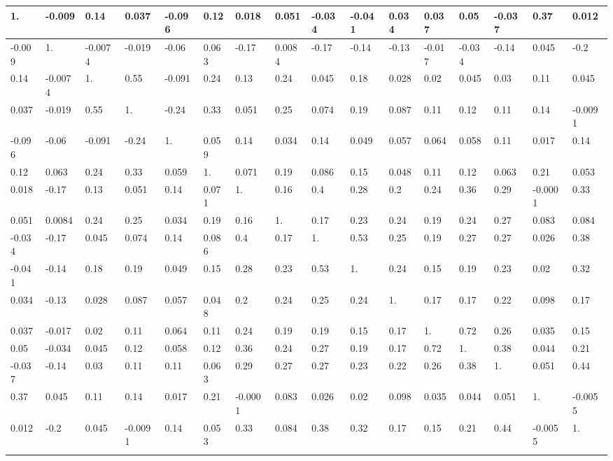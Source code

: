 \documentclass[10pt]{book}
\begin{document}
\begin{center}
\begin{tabular}{|l|l|l|l|l|l|l|l|l|l|l|l|l|l|l|l|}
\hline
1. & -0.009 & 0.14 & 0.037 & -0.096 & 0.12 & 0.018 & 0.051 & -0.034 & -0.041 & 0.034 & 0.037 & 0.05 & -0.037 & 0.37 & 0.012 \\
\hline
-0.009 & 1. & -0.0074 & -0.019 & -0.06 & 0.063 & -0.17 & 0.0084 & -0.17 & -0.14 & -0.13 & -0.017 & -0.034 & -0.14 & 0.045 & -0.2 \\
\hline
0.14 & -0.0074 & 1. & 0.55 & -0.091 & 0.24 & 0.13 & 0.24 & 0.045 & 0.18 & 0.028 & 0.02 & 0.045 & 0.03 & 0.11 & 0.045 \\
\hline
0.037 & -0.019 & 0.55 & 1. & -0.24 & 0.33 & 0.051 & 0.25 & 0.074 & 0.19 & 0.087 & 0.11 & 0.12 & 0.11 & 0.14 & -0.0091 \\
\hline
-0.096 & -0.06 & -0.091 & -0.24 & 1. & 0.059 & 0.14 & 0.034 & 0.14 & 0.049 & 0.057 & 0.064 & 0.058 & 0.11 & 0.017 & 0.14 \\
\hline
0.12 & 0.063 & 0.24 & 0.33 & 0.059 & 1. & 0.071 & 0.19 & 0.086 & 0.15 & 0.048 & 0.11 & 0.12 & 0.063 & 0.21 & 0.053 \\
\hline
0.018 & -0.17 & 0.13 & 0.051 & 0.14 & 0.071 & 1. & 0.16 & 0.4 & 0.28 & 0.2 & 0.24 & 0.36 & 0.29 & -0.0001 & 0.33 \\
\hline
0.051 & 0.0084 & 0.24 & 0.25 & 0.034 & 0.19 & 0.16 & 1. & 0.17 & 0.23 & 0.24 & 0.19 & 0.24 & 0.27 & 0.083 & 0.084 \\
\hline
-0.034 & -0.17 & 0.045 & 0.074 & 0.14 & 0.086 & 0.4 & 0.17 & 1. & 0.53 & 0.25 & 0.19 & 0.27 & 0.27 & 0.026 & 0.38 \\
\hline
-0.041 & -0.14 & 0.18 & 0.19 & 0.049 & 0.15 & 0.28 & 0.23 & 0.53 & 1. & 0.24 & 0.15 & 0.19 & 0.23 & 0.02 & 0.32 \\
\hline
0.034 & -0.13 & 0.028 & 0.087 & 0.057 & 0.048 & 0.2 & 0.24 & 0.25 & 0.24 & 1. & 0.17 & 0.17 & 0.22 & 0.098 & 0.17 \\
\hline
0.037 & -0.017 & 0.02 & 0.11 & 0.064 & 0.11 & 0.24 & 0.19 & 0.19 & 0.15 & 0.17 & 1. & 0.72 & 0.26 & 0.035 & 0.15 \\
\hline
0.05 & -0.034 & 0.045 & 0.12 & 0.058 & 0.12 & 0.36 & 0.24 & 0.27 & 0.19 & 0.17 & 0.72 & 1. & 0.38 & 0.044 & 0.21 \\
\hline
-0.037 & -0.14 & 0.03 & 0.11 & 0.11 & 0.063 & 0.29 & 0.27 & 0.27 & 0.23 & 0.22 & 0.26 & 0.38 & 1. & 0.051 & 0.44 \\
\hline
0.37 & 0.045 & 0.11 & 0.14 & 0.017 & 0.21 & -0.0001 & 0.083 & 0.026 & 0.02 & 0.098 & 0.035 & 0.044 & 0.051 & 1. & -0.0055 \\
\hline
0.012 & -0.2 & 0.045 & -0.0091 & 0.14 & 0.053 & 0.33 & 0.084 & 0.38 & 0.32 & 0.17 & 0.15 & 0.21 & 0.44 & -0.0055 & 1. \\\index{Bias unit}
\hline
\end{tabular}
\end{center}
\end{document}

